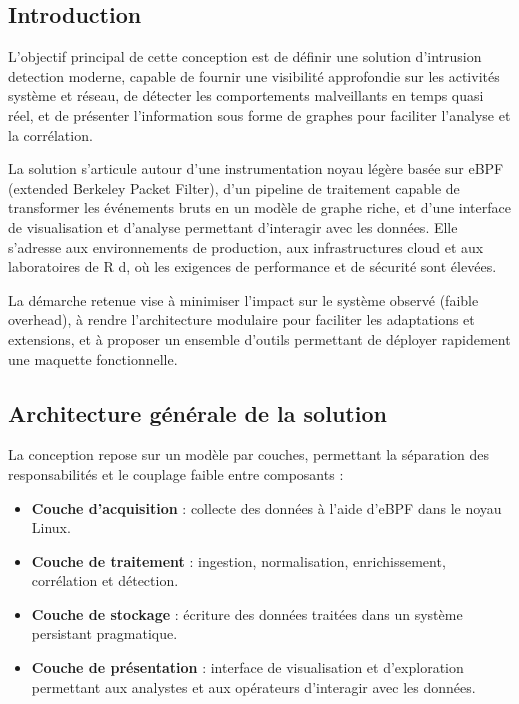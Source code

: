 \documentclass[a4paper,12pt]{article}
\begin{document}
\subsection{Introduction}

L'objectif principal de cette conception est de définir une solution d'intrusion detection moderne, capable de fournir une visibilité approfondie sur les activités système et réseau, de détecter les comportements malveillants en temps quasi réel, et de présenter l'information sous forme de graphes pour faciliter l'analyse et la corrélation.

La solution s'articule autour d'une instrumentation noyau légère basée sur eBPF (extended Berkeley Packet Filter), d'un pipeline de traitement capable de transformer les événements bruts en un modèle de graphe riche, et d'une interface de visualisation et d'analyse permettant d'interagir avec les données. Elle s'adresse aux environnements de production, aux infrastructures cloud et aux laboratoires de R
d, où les exigences de performance et de sécurité sont élevées.

La démarche retenue vise à minimiser l'impact sur le système observé (faible overhead), à rendre l'architecture modulaire pour faciliter les adaptations et extensions, et à proposer un ensemble d'outils permettant de déployer rapidement une maquette fonctionnelle.

\subsection{Architecture générale de la solution}

La conception repose sur un modèle par couches, permettant la séparation des responsabilités et le couplage faible entre composants :

\begin{itemize}
  \item \textbf{Couche d'acquisition} : collecte des données à l'aide d'eBPF dans le noyau Linux.
  \item \textbf{Couche de traitement} : ingestion, normalisation, enrichissement, corrélation et détection.
  \item \textbf{Couche de stockage} : écriture des données traitées dans un système persistant pragmatique.
  \item \textbf{Couche de présentation} : interface de visualisation et d'exploration permettant aux analystes et aux opérateurs d'interagir avec les données.
\end{itemize}
\end{document}
